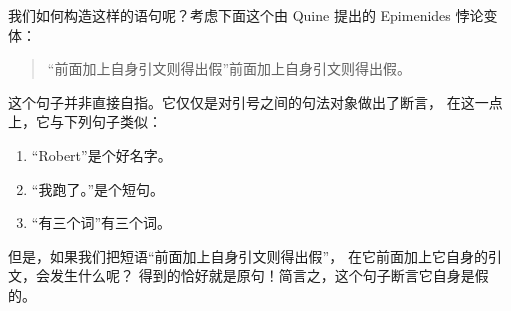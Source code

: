 \documentclass[../../../include/open-logic-section]{subfiles}
\begin{document}
我们如何构造这样的语句呢？考虑下面这个由 Quine 提出的
Epimenides 悖论变体：

\begin{quote}
“前面加上自身引文则得出假”前面加上自身引文则得出假。
\end{quote}

这个句子并非直接自指。它仅仅是对引号之间的句法对象做出了断言，
在这一点上，它与下列句子类似：

\begin{enumerate}
\item “Robert”是个好名字。
\item “我跑了。”是个短句。
\item “有三个词”有三个词。
\end{enumerate}

但是，如果我们把短语“前面加上自身引文则得出假”，
在它前面加上它自身的引文，会发生什么呢？
得到的恰好就是原句！简言之，这个句子断言它自身是假的。
\end{document}

